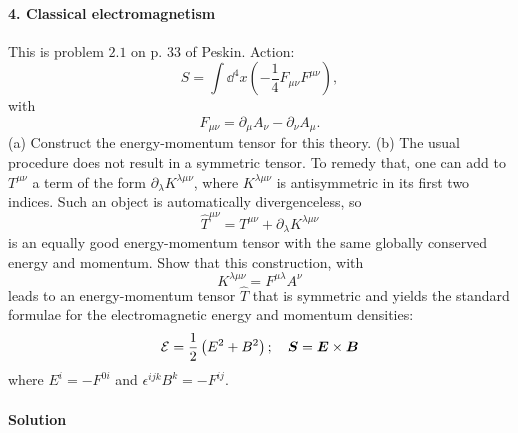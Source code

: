 \documentclass[hyperref, a4paper]{article}
\begin{document}
\paragraph{4. Classical electromagnetism} This is problem $2.1$ on p. 33 of Peskin.
Action: 
\begin{equation}
    S=\int \dd^{4} x\left(-\frac{1}{4} F_{\mu \nu} F^{\mu \nu}\right),
\end{equation}
with 
\begin{equation}
    F_{\mu \nu}=\partial_{\mu} A_{\nu}-\partial_{\nu} A_{\mu}.
\end{equation}
(a) Construct the energy-momentum tensor for this theory.
(b) The usual procedure does not result in a symmetric tensor. To remedy that, one can add to $T^{\mu \nu}$ a term of the form $\partial_{\lambda} K^{\lambda \mu \nu}$, where $K^{\lambda \mu \nu}$ is antisymmetric in its first two indices. Such an object is automatically divergenceless, so
\[
\hat{T}^{\mu \nu}=T^{\mu \nu}+\partial_{\lambda} K^{\lambda \mu \nu}
\]
is an equally good energy-momentum tensor with the same globally conserved energy and momentum. Show that this construction, with
\[
K^{\lambda \mu \nu}=F^{\mu \lambda} A^{\nu}
\]
leads to an energy-momentum tensor $\hat{T}$ that is symmetric and yields the standard formulae for the electromagnetic energy and momentum densities:
\[
\mathcal{E}=\frac{1}{2}\left(E^{2}+B^{2}\right) ; \quad \vb*{S}=\vb*{E} \times \vb*{B}
\]
where $E^{i}=-F^{0 i}$ and $\epsilon^{i j k} B^{k}=-F^{i j}$.

\paragraph{Solution} 
\end{document}
